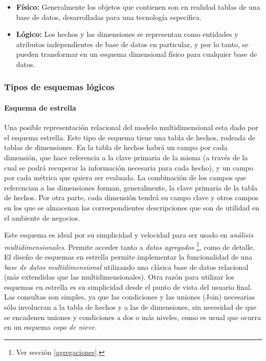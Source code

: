 \documentclass[a4paper,11pt]{article}
\begin{document}
    \begin{itemize}
      \item \textbf{Físico:} Generalmente los objetos que contienen son en realidad tablas de una base de datos, desarrolladas para una tecnología específica.
      \item \textbf{Lógico:} Los hechos y las dimensiones se representan como entidades y atributos independientes de base de datos en particular,
      y por lo tanto, se pueden transformar en un esquema dimensional físico para cualquier base de datos.
    \end{itemize}
    
    \subsubsection{Tipos de esquemas lógicos}
    
    \paragraph{Esquema de estrella}
  
    Una posible representación relacional del modelo multidimensional esta dado por el esquema estrella.
    Este tipo de esquema tiene una tabla de hechos, rodeada de tablas de dimensiones. En la tabla de hechos habrá un campo por cada dimensión, que
    hace referencia a la clave primaria de la misma (a través de la cual se podrá recuperar la información necesaria para cada hecho),
    y un campo por cada métrica que quiera ser evaluada. La combinación de los campos que referencian a las dimensiones forman, generalmente, la clave primaria de la
    tabla de hechos. Por otra parte, cada dimensión tendrá su campo clave y otros campos en los que se almacenan las correspondientes descripciones que son 
    de utilidad en el ambiente de negocios.
    
    Este esquema es ideal por su simplicidad y velocidad para ser usado en \textit{análisis multidimensionales}. Permite 
    acceder tanto a \textit{datos agregados} \footnote{Ver sección \ref{agregaciones}.}, como de detalle.
    El diseño de esquemas en estrella permite implementar la funcionalidad de una \textit{base de datos 
    multidimensional} utilizando una clásica base de datos relacional (más extendidas que las multidimensionales). Otra razón para utilizar los esquemas en 
    estrella es su simplicidad desde el punto de vista del usuario final. Las consultas son simples, ya que las condiciones y las uniones (Join) 
    necesarias sólo involucran a la tabla de hechos y a las de dimensiones, sin necesidad de que se encadenen uniones y condiciones a dos o más niveles, como 
    es usual que ocurra en un esquema \textit{copo de nieve}.
    
\end{document}
